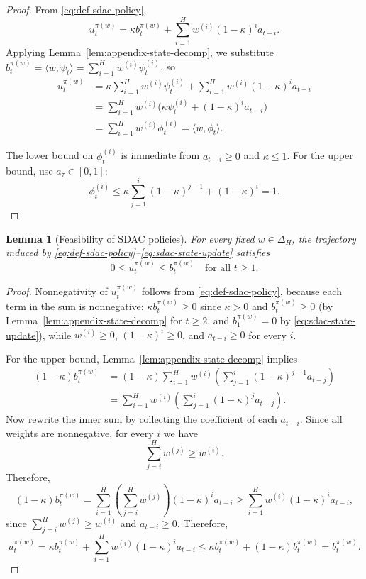 \documentclass[11pt]{article}
\newtheorem{lemma}{Lemma}
\begin{document}
\begin{proof}
From \eqref{eq:def-sdac-policy},
\[
u_t^{\pi(w)} = \kappa b_t^{\pi(w)} + \sum_{i=1}^H w^{(i)}(1-\kappa)^i a_{t-i}.
\]
Applying Lemma~\ref{lem:appendix-state-decomp}, we substitute
\(b_t^{\pi(w)}=\langle w,\psi_t\rangle=\sum_{i=1}^H w^{(i)}\psi_t^{(i)}\), so
\[
\begin{aligned}
u_t^{\pi(w)}
&= \kappa\sum_{i=1}^H w^{(i)}\psi_t^{(i)} + \sum_{i=1}^H w^{(i)}(1-\kappa)^i a_{t-i} \\
&= \sum_{i=1}^H w^{(i)}\bigl(\kappa\psi_t^{(i)} + (1-\kappa)^i a_{t-i}\bigr) \\
&= \sum_{i=1}^H w^{(i)}\phi_t^{(i)}
= \langle w,\phi_t\rangle.
\end{aligned}
\]

The lower bound on $\phi_t^{(i)}$ is immediate from $a_{t-i}\ge 0$ and $\kappa\le 1$. For the upper bound, use $a_\tau\in[0,1]$:
\[
\phi_t^{(i)}
\le \kappa\sum_{j=1}^{i}(1-\kappa)^{j-1} + (1-\kappa)^i
= 1.
\]
\end{proof}

\begin{lemma}[Feasibility of SDAC policies]
\label{lem:appendix-feasibility}
For every fixed $w\in\Delta_H$, the trajectory induced by \eqref{eq:def-sdac-policy}--\eqref{eq:sdac-state-update} satisfies
\[
0\le u_t^{\pi(w)}\le b_t^{\pi(w)} \quad \text{for all } t\ge 1.
\]
\end{lemma}

\begin{proof}
Nonnegativity of $u_t^{\pi(w)}$ follows from \eqref{eq:def-sdac-policy}, because each term in the sum is nonnegative: $\kappa b_t^{\pi(w)}\ge 0$ since $\kappa>0$ and $b_t^{\pi(w)}\ge 0$ (by Lemma~\ref{lem:appendix-state-decomp} for $t\ge 2$, and $b_1^{\pi(w)}=0$ by \eqref{eq:sdac-state-update}), while $w^{(i)}\ge 0$, $(1-\kappa)^i\ge 0$, and $a_{t-i}\ge 0$ for every $i$.

For the upper bound, Lemma~\ref{lem:appendix-state-decomp} implies
\begin{align*}
(1-\kappa)b_t^{\pi(w)}
&= (1-\kappa)\sum_{i=1}^H w^{(i)}\!\left(\sum_{j=1}^{i}(1-\kappa)^{j-1}a_{t-j}\right) \\
&= \sum_{i=1}^H w^{(i)}\!\left(\sum_{j=1}^{i}(1-\kappa)^j a_{t-j}\right).
\end{align*}
Now rewrite the inner sum by collecting the coefficient of each $a_{t-i}$. Since all weights are nonnegative, for every $i$ we have
\[
\sum_{j=i}^{H} w^{(j)} \ge w^{(i)}.
\]
Therefore,
\[
(1-\kappa)b_t^{\pi(w)}
=
\sum_{i=1}^{H}\left(\sum_{j=i}^{H}w^{(j)}\right)(1-\kappa)^i a_{t-i}
\ge
\sum_{i=1}^{H}w^{(i)}(1-\kappa)^i a_{t-i},
\]
since $\sum_{j=i}^{H}w^{(j)}\ge w^{(i)}$ and $a_{t-i}\ge 0$. Therefore,
\[
u_t^{\pi(w)}
=
\kappa b_t^{\pi(w)} + \sum_{i=1}^{H}w^{(i)}(1-\kappa)^i a_{t-i}
\le
\kappa b_t^{\pi(w)} + (1-\kappa)b_t^{\pi(w)}
=
b_t^{\pi(w)}.
\]
\end{proof}
\end{document}
